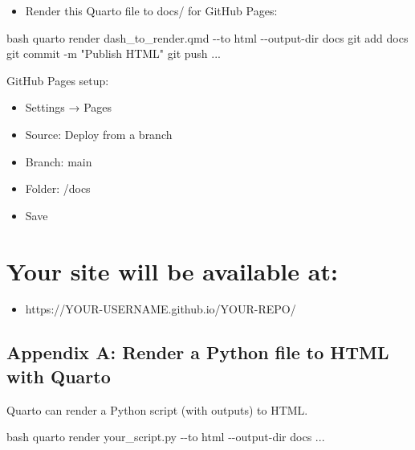 \documentclass[
  letterpaper,
  DIV=11,
  numbers=noendperiod]{scrreprt}
\newenvironment{Shaded}{\begin{snugshade}}{\end{snugshade}}
\newcommand{\AttributeTok}[1]{\textcolor[rgb]{0.40,0.45,0.13}{#1}}
\newcommand{\ExtensionTok}[1]{\textcolor[rgb]{0.00,0.23,0.31}{#1}}
\newcommand{\FunctionTok}[1]{\textcolor[rgb]{0.28,0.35,0.67}{#1}}
\newcommand{\KeywordTok}[1]{\textcolor[rgb]{0.00,0.23,0.31}{\textbf{#1}}}
\newcommand{\NormalTok}[1]{\textcolor[rgb]{0.00,0.23,0.31}{#1}}
\newcommand{\StringTok}[1]{\textcolor[rgb]{0.13,0.47,0.30}{#1}}
\providecommand{\tightlist}{%
  \setlength{\itemsep}{0pt}\setlength{\parskip}{0pt}}\usepackage{longtable,booktabs,array}
\begin{document}
\begin{itemize}
\tightlist
\item
  Render this Quarto file to docs/ for GitHub Pages:
\end{itemize}

\begin{Shaded}
\begin{Highlighting}[]
\KeywordTok{\textasciigrave{}\textasciigrave{}\textasciigrave{}}\FunctionTok{bash} 
\ExtensionTok{quarto}\NormalTok{ render dash\_to\_render.qmd }\AttributeTok{{-}{-}to}\NormalTok{ html }\AttributeTok{{-}{-}output{-}dir}\NormalTok{ docs }
\FunctionTok{git}\NormalTok{ add docs }
\FunctionTok{git}\NormalTok{ commit }\AttributeTok{{-}m} \StringTok{"Publish HTML"} 
\FunctionTok{git}\NormalTok{ push }
\ExtensionTok{...}
\end{Highlighting}
\end{Shaded}

GitHub Pages setup:

\begin{itemize}
\tightlist
\item
  Settings → Pages
\item
  Source: Deploy from a branch
\item
  Branch: main
\item
  Folder: /docs
\item
  Save
\end{itemize}


\chapter{Your site will be available
at:}\label{your-site-will-be-available-at}

\begin{itemize}
\tightlist
\item
  https://YOUR-USERNAME.github.io/YOUR-REPO/
\end{itemize}

\section{Appendix A: Render a Python file to HTML with
Quarto}\label{appendix-a-render-a-python-file-to-html-with-quarto}

Quarto can render a Python script (with outputs) to HTML.

\begin{Shaded}
\begin{Highlighting}[]
\KeywordTok{\textasciigrave{}\textasciigrave{}\textasciigrave{}}\FunctionTok{bash} 
\ExtensionTok{quarto}\NormalTok{ render your\_script.py }\AttributeTok{{-}{-}to}\NormalTok{ html }\AttributeTok{{-}{-}output{-}dir}\NormalTok{ docs}
\ExtensionTok{...}
\end{Highlighting}
\end{Shaded}
\end{document}
